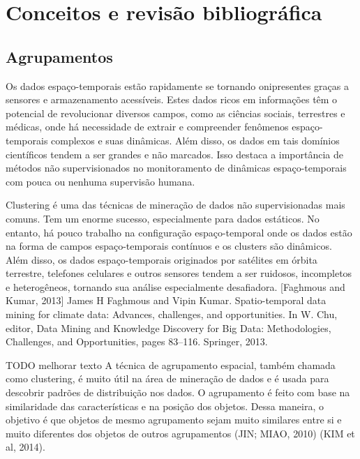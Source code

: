 \chapter{Conceitos e revisão bibliográfica}
\label{cap:estadodaarte}

\section{Agrupamentos}
Os dados espaço-temporais estão rapidamente se tornando onipresentes graças a sensores e armazenamento acessíveis. Estes dados ricos em informações têm o potencial de revolucionar diversos campos, como as ciências sociais, terrestres e médicas, onde há necessidade de extrair e compreender fenômenos espaço-temporais complexos e suas dinâmicas. Além disso, os dados em tais domínios científicos tendem a ser grandes e não marcados. Isso destaca a importância de métodos não supervisionados no monitoramento de dinâmicas espaço-temporais com pouca ou nenhuma supervisão humana.

Clustering é uma das técnicas de mineração de dados não supervisionadas mais comuns. Tem um enorme sucesso, especialmente para dados estáticos. No entanto, há pouco trabalho na configuração espaço-temporal onde os dados estão na forma de campos espaço-temporais contínuos e os clusters são dinâmicos. Além disso, os dados espaço-temporais originados por satélites em órbita terrestre, telefones celulares e outros sensores tendem a ser ruidosos, incompletos e heterogêneos, tornando sua análise especialmente desafiadora.
\cite{faghmous2013}
[Faghmous and Kumar, 2013]
James H Faghmous and Vipin
Kumar. Spatio-temporal data mining for climate data: Advances, challenges, and opportunities. In W. Chu, editor, Data Mining and Knowledge Discovery for Big Data: Methodologies, Challenges, and Opportunities, pages 83–116. Springer, 2013.

TODO melhorar texto
A técnica de agrupamento espacial, também chamada como clustering, é muito útil na
área de mineração de dados e é usada para descobrir padrões de distribuição nos dados. O
agrupamento é feito com base na similaridade das características e na posição dos objetos.
Dessa maneira, o objetivo é que objetos de mesmo agrupamento sejam muito similares entre
si e muito diferentes dos objetos de outros agrupamentos (JIN; MIAO, 2010) (KIM et al, 2014).

